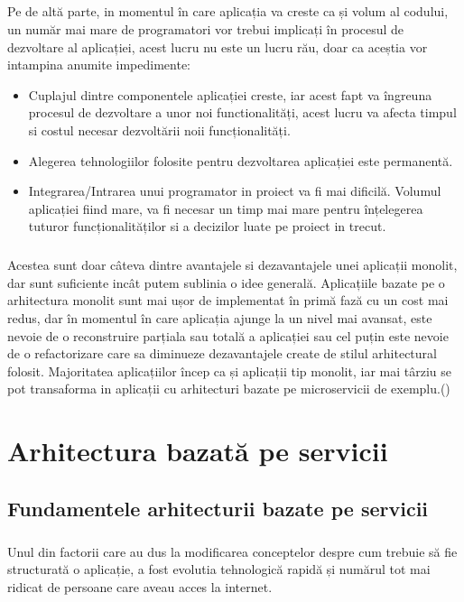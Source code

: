 \documentclass[12pt]{report}
\begin{document}
  	\paragraph{}Pe de altă parte, in momentul în care aplicația va creste ca și volum al codului, un număr mai mare de programatori vor trebui implicați în procesul de dezvoltare al aplicației, acest lucru nu este un lucru rău, doar ca aceștia vor intampina anumite impedimente:
  	\begin{itemize}
  	\item Cuplajul dintre componentele aplicației creste, iar acest fapt va îngreuna procesul de dezvoltare a unor noi functionalități, acest lucru va afecta timpul si costul necesar dezvoltării noii funcționalități.  
	\item Alegerea tehnologiilor folosite pentru dezvoltarea aplicației este permanentă.
	\item Integrarea/Intrarea unui programator in proiect va fi mai dificilă. Volumul aplicației fiind mare, va fi necesar un timp mai mare pentru înțelegerea tuturor funcționalităților si a decizilor luate pe proiect in trecut.
  	\end{itemize}
  	\paragraph{}Acestea sunt doar câteva dintre avantajele si dezavantajele unei aplicații monolit, dar sunt suficiente incât putem sublinia o idee generală. Aplicațiile bazate pe o arhitectura monolit sunt mai ușor de implementat în primă fază cu un cost mai redus, dar în momentul în care aplicația ajunge la un nivel mai avansat, este nevoie de o reconstruire parțiala sau totală a aplicației sau cel puțin este nevoie de o refactorizare care sa diminueze dezavantajele create de stilul arhitectural folosit. Majoritatea aplicațiilor încep ca și aplicații tip monolit, iar mai târziu se pot transaforma in aplicații cu arhitecturi bazate pe microservicii de exemplu.(\cite{thones2015microservices})
  \chapter{Arhitectura bazată pe servicii}
  	\section{Fundamentele arhitecturii bazate pe servicii}
  	\paragraph{}Unul din factorii care au dus la modificarea conceptelor despre cum trebuie să fie structurată o aplicație, a fost evolutia tehnologică rapidă și numărul tot mai ridicat de persoane care aveau acces la internet.
\end{document}
